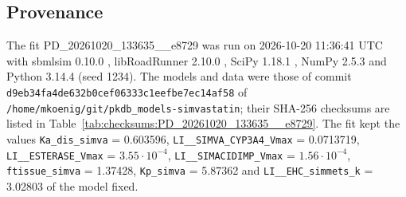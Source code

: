 \documentclass{article}
\begin{document}
\subsection{Provenance}

The fit PD\_20261020\_133635\_\_e8729 was run on 2026-10-20 11:36:41 UTC with sbmlsim 0.10.0 \cite{Koenig2026_sbmlsim}, libRoadRunner 2.10.0 \cite{Welsh2023}, SciPy 1.18.1 \cite{Virtanen2020}, NumPy 2.5.3 \cite{Harris2020} and Python 3.14.4 (seed 1234). The models and data were those of commit \texttt{d9eb34fa4de632b0cef06333c1eefbe7ec14af58} of \texttt{/home/mkoenig/git/pkdb\_models-simvastatin}; their SHA-256 checksums are listed in Table~\ref{tab:checksums:PD_20261020_133635__e8729}. The fit kept the values \texttt{Ka\_dis\_simva} = 0.603596, \texttt{LI\_\_SIMVA\_CYP3A4\_Vmax} = 0.0713719, \texttt{LI\_\_ESTERASE\_Vmax} = $3.55 \cdot 10^{-4}$, \texttt{LI\_\_SIMACIDIMP\_Vmax} = $1.56 \cdot 10^{-4}$, \texttt{ftissue\_simva} = 1.37428, \texttt{Kp\_simva} = 5.87362 and \texttt{LI\_\_EHC\_simmets\_k} = 3.02803 of the model fixed.
\end{document}
